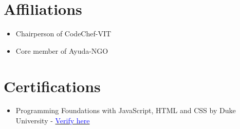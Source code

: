 \documentclass[a4paper,10pt]{article}
\begin{document}
\vspace{10pt}

\section*{Affiliations}
\begin{itemize}
    \item Chairperson of CodeChef-VIT
    \item Core member of Ayuda-NGO
\end{itemize}
\vspace{10pt}

\section*{Certifications}
\begin{itemize}
    \item Programming Foundations with JavaScript, HTML and CSS by Duke University - 
    \href{https://coursera.org/verify/ZZVTGPTSR36H}{\textcolor{blue}{Verify here}}
\end{itemize}
\end{document}
